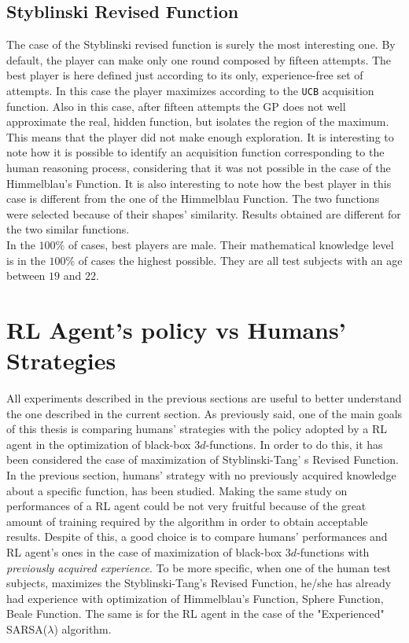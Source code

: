 \subsection{Styblinski Revised Function}
The case of the Styblinski revised function is surely the most interesting one. By default, the player can make only one round composed by fifteen attempts. The best player is here defined just according to its only, experience-free set of attempts. In this case the player maximizes according to the {\tt UCB} acquisition function. Also in this case, after fifteen attempts the GP does not well approximate the real, hidden function, but isolates the region of the maximum. This means that the player did not make enough exploration. It is interesting to note how it is possible to identify an acquisition function corresponding to the human reasoning process, considering that it was not possible in the case of the Himmelblau's Function. It is also interesting to note how the best player in this case is different from the one of the Himmelblau Function. The two functions were selected because of their shapes' similarity. Results obtained are different for the two similar functions. \\

In the $100\%$ of cases, best players are male. Their mathematical knowledge level is in the $100\%$ of cases the highest possible. They are all test subjects with an age between $19$ and $22$.

\section{RL Agent's  policy vs Humans' Strategies}
All experiments described in the previous sections are useful to better understand the one described in the current section. As previously said, one of the main goals of this thesis is comparing humans' strategies with the policy adopted by a RL agent in the optimization of black-box $3d$-functions. In order to do this, it has been considered the case of maximization of Styblinski-Tang' s Revised Function. In the previous section, humans' strategy with no previously acquired knowledge about a specific function, has been studied. Making the same study on performances of a RL agent could be not very fruitful because of the great amount of training required by the algorithm in order to obtain acceptable results. Despite of this, a good choice is to compare humans' performances and RL agent's ones in the case of maximization of black-box $3d$-functions with \textit{previously acquired experience}. To be more specific, when one of the human test subjects, maximizes the Styblinski-Tang's Revised Function, he/she has already had experience with optimization of Himmelblau's Function, Sphere Function, Beale Function. The same is for the RL agent in the case of the "Experienced" SARSA($\lambda$) algorithm.

